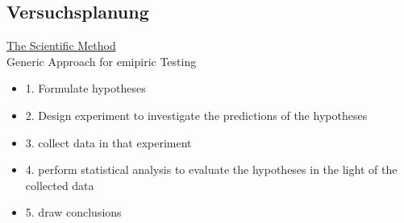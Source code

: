 \documentclass[a4paper,10pt,oneside]{article}
\begin{document}
\subsection{Versuchsplanung}
\underline{The Scientific Method} \\

Generic Approach for emipiric Testing
	\begin{itemize}
		\item 1. Formulate hypotheses
		\item 2. Design experiment to investigate the predictions of the hypotheses
		\item 3. collect data in that experiment
		\item 4. perform statistical analysis to evaluate the hypotheses in the light of the collected data
		\item 5. draw conclusions
	\end{itemize}
	
\end{document}
